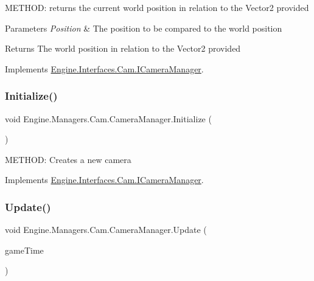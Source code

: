 M\+E\+T\+H\+OD\+: returns the current world position in relation to the Vector2 provided 


\begin{DoxyParams}{Parameters}
{\em Position} & The position to be compared to the world position\\
\hline
\end{DoxyParams}
\begin{DoxyReturn}{Returns}
The world position in relation to the Vector2 provided
\end{DoxyReturn}


Implements \hyperlink{a00422_a7d9fc1d792ddc3495bff23daac2a8d2a}{Engine.\+Interfaces.\+Cam.\+I\+Camera\+Manager}.

\mbox{\label{a00494_a6244a0582982e64f49df0a6862768a21}} 
\subsubsection{\texorpdfstring{Initialize()}{Initialize()}}
{\footnotesize\ttfamily void Engine.\+Managers.\+Cam.\+Camera\+Manager.\+Initialize (\begin{DoxyParamCaption}{ }\end{DoxyParamCaption})\hspace{0.3cm}{\ttfamily [inline]}}



M\+E\+T\+H\+OD\+: Creates a new camera 



Implements \hyperlink{a00422_a21e0ce6b0ada068546161ecf02559912}{Engine.\+Interfaces.\+Cam.\+I\+Camera\+Manager}.

\mbox{\label{a00494_a43e367859b47354445da2a304eff7ec4}} 
\subsubsection{\texorpdfstring{Update()}{Update()}}
{\footnotesize\ttfamily void Engine.\+Managers.\+Cam.\+Camera\+Manager.\+Update (\begin{DoxyParamCaption}\item[{Game\+Time}]{game\+Time }\end{DoxyParamCaption})\hspace{0.3cm}{\ttfamily [inline]}}



